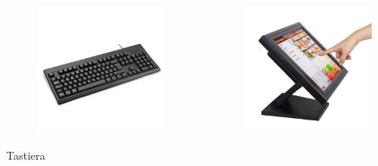 \documentclass[]{beamer}
\begin{document}
\begin{frame}
\begin{columns}
\begin{column}{.22\textwidth}
\begin{center}
\begin{figure}
      \includegraphics[width=\columnwidth]{img/tastiera.jpg}
    \end{figure}
    Tastiera
    \end{center}
\end{column}
\begin{column}{.22\textwidth}
  \begin{center} 
    \begin{figure}
      \includegraphics[width=\columnwidth]{img/touchscreen.jpg}

\end{figure}
\end{center}
\end{column}
\end{columns}
\end{frame}
\end{document}
